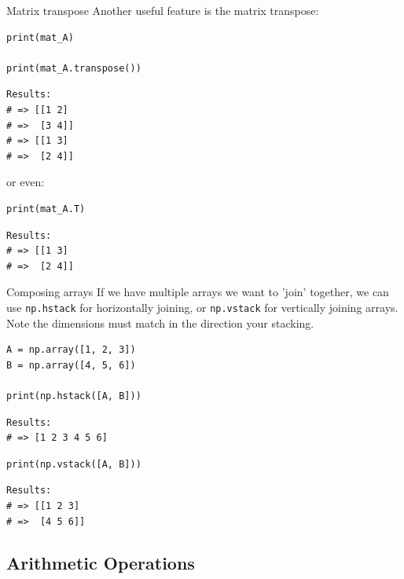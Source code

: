 \documentclass[10pt]{beamer}
\begin{document}
\begin{frame}[label={sec:org948241c},fragile]{Matrix transpose}
 Another useful feature is the matrix transpose:

\begin{verbatim}
print(mat_A)

print(mat_A.transpose())
\end{verbatim}

\begin{verbatim}
Results: 
# => [[1 2]
# =>  [3 4]]
# => [[1 3]
# =>  [2 4]]
\end{verbatim}


or even:

\begin{verbatim}
print(mat_A.T)
\end{verbatim}

\begin{verbatim}
Results: 
# => [[1 3]
# =>  [2 4]]
\end{verbatim}
\end{frame}


\begin{frame}[label={sec:orgffc74d8},fragile]{Composing arrays}
 If we have multiple arrays we want to 'join' together, we can use \texttt{np.hstack} for
horizontally joining, or \texttt{np.vstack} for vertically joining arrays. \alert{Note} the dimensions
must match in the direction your stacking.

\begin{verbatim}
A = np.array([1, 2, 3])
B = np.array([4, 5, 6])

print(np.hstack([A, B]))
\end{verbatim}

\begin{verbatim}
Results: 
# => [1 2 3 4 5 6]
\end{verbatim}


\begin{verbatim}
print(np.vstack([A, B]))
\end{verbatim}

\begin{verbatim}
Results: 
# => [[1 2 3]
# =>  [4 5 6]]
\end{verbatim}
\end{frame}

\subsection{Arithmetic Operations}
\label{sec:org08ea177}
\end{document}
